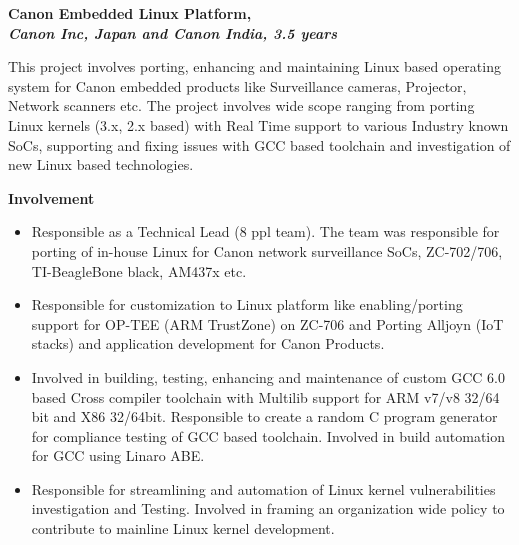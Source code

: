 \documentclass[a4paper,10pt]{memoir} %
\newcommand{\SmallSep}{\vspace{0.5em}} %
\newcommand{\CVItem}[2]{ %
\textbf{\color{RoyalBlue} #1}\par
#2
\SmallSep %
}
\begin{document}
\CVItem{Canon Embedded Linux Platform, \\
\textit{Canon Inc, Japan and Canon India, 3.5 years}} {
This project involves porting, enhancing and maintaining Linux based operating system for Canon embedded products like Surveillance cameras, Projector, Network scanners etc. The project involves wide scope ranging from porting Linux kernels (3.x, 2.x based) with Real Time support to various Industry known SoCs, supporting and fixing issues with GCC based toolchain and investigation of new Linux based technologies. 

\textbf{Involvement}
\renewcommand{\labelitemi}{$\bullet$}
\begin{itemize}
\item Responsible as a Technical Lead (8 ppl team). The team was responsible for porting of in-house Linux for Canon network surveillance SoCs, ZC-702/706, TI-BeagleBone black, AM437x etc.
\item Responsible for customization to Linux platform like enabling/porting support for OP-TEE (ARM TrustZone) on ZC-706 and Porting Alljoyn (IoT stacks) and application development for Canon Products. 
\item Involved in building, testing, enhancing and maintenance of custom GCC 6.0 based Cross compiler toolchain with Multilib support for ARM v7/v8 32/64 bit and X86 32/64bit. Responsible to create a random C program generator for compliance testing of GCC based toolchain. Involved in build automation for GCC using Linaro ABE.
\item Responsible for streamlining and automation of Linux kernel vulnerabilities investigation and Testing. Involved in framing an organization wide policy to contribute to mainline Linux kernel development. 
\end{itemize}
\hrulefill
}
\end{document}
